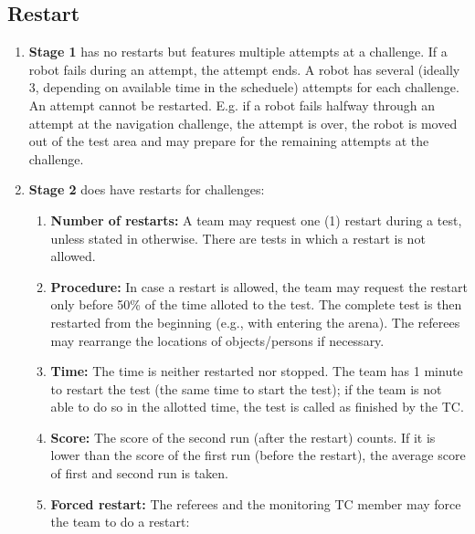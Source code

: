 \subsection{Restart}
\label{rule:restart}
\begin{enumerate}
	\item \textbf{Stage 1} has no restarts but features multiple attempts at a challenge. 
	If a robot fails during an attempt, the attempt ends. 
	A robot has several (ideally 3, depending on available time in the scheduele) attempts for each challenge. An attempt cannot be restarted. 
	E.g. if a robot fails halfway through an attempt at the navigation challenge, the attempt is over, the robot is moved out of the test area and may prepare for the remaining attempts at the challenge.

	\item \textbf{Stage 2} does have restarts for challenges:
	\begin{enumerate}
		\item \textbf{Number of restarts:} A team may request one (1) restart during a test, unless stated in otherwise. There are tests in which a restart is not allowed.
		\item \textbf{Procedure:} In case a restart is allowed, the team may request the restart only before 50\% of the time alloted to the test. The complete test is then restarted from the beginning (e.g., with entering the arena). The referees may rearrange the locations of objects/persons if necessary.
		\item \textbf{Time:} The time is neither restarted nor stopped. The team has 1 minute to restart the test (the same time to start the test); if the team is not able to do so in the allotted time, the test is called as finished by the TC.
		\item \textbf{Score:} The score of the second run (after the restart) counts. If it is lower than the score of the first run (before the restart), the average score of first and second run is taken.
		\item \textbf{Forced restart:} The referees and the monitoring TC member may force the team to do a restart:
	\end{enumerate}
\end{enumerate}


